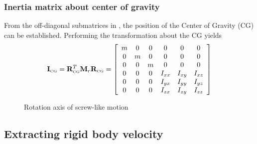 \subsubsection{Inertia matrix about center of gravity}

From the off-diagonal submatrices in ,
the position of the Center of Gravity (CG) can be established.
Performing the transformation about the CG yields
%
\begin{equation}
{\mf I}_\CGtiny = {\mf R}_\CGtiny^T {\mf M}_r {\mf R}_\CGtiny =
\left[\begin{array}{*6c}
m & 0 & 0 & 0 & 0 & 0 \\
0 & m & 0 & 0 & 0 & 0 \\
0 & 0 & m & 0 & 0 & 0 \\
0 & 0 & 0 & I_{xx} & I_{xy} & I_{xz} \\
0 & 0 & 0 & I_{yx} & I_{yy} & I_{yz} \\
0 & 0 & 0 & I_{zx} & I_{zy} & I_{zz}
\end{array}\right]
\label{eq:Icg}
\end{equation}

\begin{figure}[b]
\caption{Rotation axis of screw-like motion}
\label{fig:screw-like motion}
\end{figure}

\subsection{Extracting rigid body velocity}
\label{subs:Extracting rigid body velocity}

